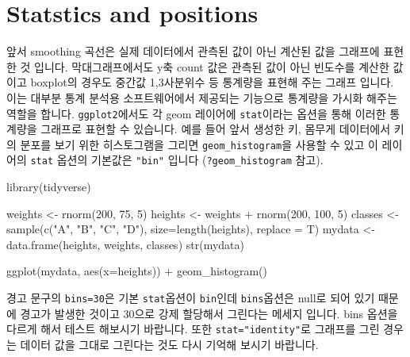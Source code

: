 \documentclass[
]{book}
\newenvironment{Shaded}{\begin{snugshade}}{\end{snugshade}}
\newcommand{\AttributeTok}[1]{\textcolor[rgb]{0.77,0.63,0.00}{#1}}
\newcommand{\DecValTok}[1]{\textcolor[rgb]{0.00,0.00,0.81}{#1}}
\newcommand{\FunctionTok}[1]{\textcolor[rgb]{0.00,0.00,0.00}{#1}}
\newcommand{\NormalTok}[1]{#1}
\newcommand{\OtherTok}[1]{\textcolor[rgb]{0.56,0.35,0.01}{#1}}
\newcommand{\SpecialCharTok}[1]{\textcolor[rgb]{0.00,0.00,0.00}{#1}}
\newcommand{\StringTok}[1]{\textcolor[rgb]{0.31,0.60,0.02}{#1}}
\begin{document}
\hypertarget{statstics-and-positions}{%
\section{Statstics and positions}\label{statstics-and-positions}}

앞서 smoothing 곡선은 실제 데이터에서 관측된 값이 아닌 계산된 값을 그래프에 표현한 것 입니다. 막대그래프에서도 y축 count 값은 관측된 값이 아닌 빈도수를 계산한 값이고 boxplot의 경우도 중간값 1,3사분위수 등 통계량을 표현해 주는 그래프 입니다. 이는 대부분 통계 분석용 소프트웨어에서 제공되는 기능으로 통계량을 가시화 해주는 역할을 합니다. \texttt{ggplot2}에서도 각 geom 레이어에 \texttt{stat}이라는 옵션을 통해 이러한 통계량을 그래프로 표현할 수 있습니다. 예를 들어 앞서 생성한 키, 몸무게 데이터에서 키의 분포를 보기 위한 히스토그램을 그리면 \texttt{geom\_histogram}을 사용할 수 있고 이 레이어의 \texttt{stat} 옵션의 기본값은 \texttt{"bin"} 입니다 (\texttt{?geom\_histogram} 참고).

\begin{Shaded}
\begin{Highlighting}[]
\FunctionTok{library}\NormalTok{(tidyverse)}

\NormalTok{weights }\OtherTok{\textless{}{-}} \FunctionTok{rnorm}\NormalTok{(}\DecValTok{200}\NormalTok{, }\DecValTok{75}\NormalTok{, }\DecValTok{5}\NormalTok{)}
\NormalTok{heights }\OtherTok{\textless{}{-}}\NormalTok{ weights }\SpecialCharTok{+} \FunctionTok{rnorm}\NormalTok{(}\DecValTok{200}\NormalTok{, }\DecValTok{100}\NormalTok{, }\DecValTok{5}\NormalTok{)}
\NormalTok{classes }\OtherTok{\textless{}{-}} \FunctionTok{sample}\NormalTok{(}\FunctionTok{c}\NormalTok{(}\StringTok{"A"}\NormalTok{, }\StringTok{"B"}\NormalTok{, }\StringTok{"C"}\NormalTok{, }\StringTok{"D"}\NormalTok{), }\AttributeTok{size=}\FunctionTok{length}\NormalTok{(heights), }\AttributeTok{replace =}\NormalTok{ T)}
\NormalTok{mydata }\OtherTok{\textless{}{-}} \FunctionTok{data.frame}\NormalTok{(heights, weights, classes)}
\FunctionTok{str}\NormalTok{(mydata)}

\FunctionTok{ggplot}\NormalTok{(mydata, }\FunctionTok{aes}\NormalTok{(}\AttributeTok{x=}\NormalTok{heights)) }\SpecialCharTok{+}
  \FunctionTok{geom\_histogram}\NormalTok{()}
\end{Highlighting}
\end{Shaded}

경고 문구의 \texttt{bins=30}은 기본 \texttt{stat}옵션이 \texttt{bin}인데 \texttt{bins}옵션은 null로 되어 있기 때문에 경고가 발생한 것이고 30으로 강제 할당해서 그린다는 메세지 입니다. bins 옵션을 다르게 해서 테스트 해보시기 바랍니다. 또한 \texttt{stat="identity"}로 그래프를 그린 경우는 데이터 값을 그대로 그린다는 것도 다시 기억해 보시기 바랍니다.
\end{document}
